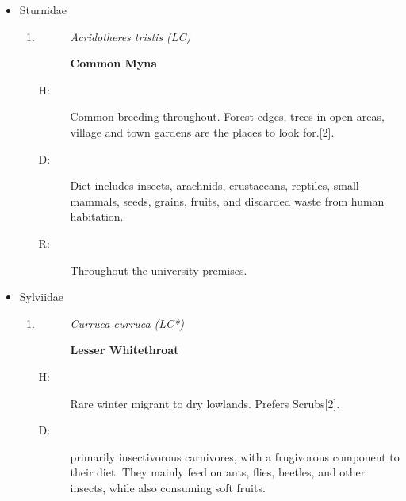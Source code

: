 \begin{itemize}
\begin{enumerate}
\begin{description}
\item[H: ]%
Fairly common breeding resident found throughout the island. Uncommon in the higher hills. Avoid interior of wet evergreen forests and typically found inside well wooded areas and residential gardens of villages and towns{[}2{]}.%
\item[D: ]%
Primary diet comprises insects, including beetles and grasshoppers. May also prey on small vertebrates such as rodents, small birds, and lizards.%
\item[R: ]%
In seetha gangula area at night. One specimen was recorded inside a building during day time.%
\end{description}%
\end{enumerate}%
\item%
Sturnidae%
\begin{enumerate}%
\item%
\begin{description}%
\item[]%
\textit{Acridotheres tristis (LC)}%
\item[]%
\textbf{Common Myna}%
\end{description}%
\begin{description}%
\item[H: ]%
Common breeding throughout. Forest edges, trees in open areas, village and town gardens are the places to look for.{[}2{]}.%
\item[D: ]%
Diet includes insects, arachnids, crustaceans, reptiles, small mammals, seeds, grains, fruits, and discarded waste from human habitation.%
\item[R: ]%
Throughout the university premises.%
\end{description}%
\end{enumerate}%
\item%
Sylviidae%
\begin{enumerate}%
\item%
\begin{description}%
\item[]%
\textit{Curruca curruca (LC*)}%
\item[]%
\textbf{Lesser Whitethroat}%
\end{description}%
\begin{description}%
\item[H: ]%
Rare winter migrant to dry lowlands. Prefers Scrubs{[}2{]}.%
\item[D: ]%
primarily insectivorous carnivores, with a frugivorous component to their diet. They mainly feed on ants, flies, beetles, and other insects, while also consuming soft fruits.%

\end{description}
\end{enumerate}
\end{itemize}
